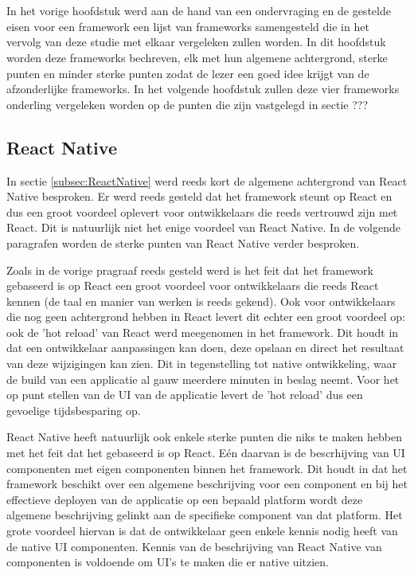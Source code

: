 \chapter{}
\label{ch:eigenschappen-frameworks}

In het vorige hoofdstuk werd aan de hand van een ondervraging \autocite{Liu2020} en de gestelde eisen voor een framework een lijst van frameworks samengesteld die in het vervolg van deze studie met elkaar vergeleken zullen worden. In dit hoofdstuk worden deze frameworks bechreven, elk met hun algemene achtergrond, sterke punten en minder sterke punten zodat de lezer een goed idee krijgt van de afzonderlijke frameworks. In het volgende hoofdstuk zullen deze vier frameworks onderling vergeleken worden op de punten die zijn vastgelegd in sectie ???

\section{React Native}
\label{sec:detailsReactNative}

In sectie \ref{subsec:ReactNative} werd reeds kort de algemene achtergrond van React Native besproken. Er werd reeds gesteld dat het framework steunt op React en dus een groot voordeel oplevert voor ontwikkelaars die reeds vertrouwd zijn met React. Dit is natuurlijk niet het enige voordeel van React Native. In de volgende paragrafen worden de sterke punten van React Native verder besproken.

Zoals in de vorige pragraaf reeds gesteld werd is het feit dat het framework gebaseerd is op React een groot voordeel voor ontwikkelaars die reeds React kennen (de taal en manier van werken is reeds gekend). Ook voor ontwikkelaars die nog geen achtergrond hebben in React levert dit echter een groot voordeel op: ook de 'hot reload' van React werd meegenomen in het framework. Dit houdt in dat een ontwikkelaar aanpassingen kan doen, deze opslaan en direct het resultaat van deze wijzigingen kan zien. Dit in tegenstelling tot native ontwikkeling, waar de build van een applicatie al gauw meerdere minuten in beslag neemt. Voor het op punt stellen van de UI van de applicatie levert de 'hot reload' dus een gevoelige tijdsbesparing op.

React Native heeft natuurlijk ook enkele sterke punten die niks te maken hebben met het feit dat het gebaseerd is op React. Eén daarvan is de bescrhijving van UI componenten met eigen componenten binnen het framework. Dit houdt in dat het framework beschikt over een algemene beschrijving voor een component en bij het effectieve deployen van de applicatie op een bepaald platform wordt deze algemene beschrijving gelinkt aan de specifieke component van dat platform. Het grote voordeel hiervan is dat de ontwikkelaar geen enkele kennis nodig heeft van de native UI componenten. Kennis van de beschrijving van React Native van componenten is voldoende om UI's te maken die er native uitzien. 

